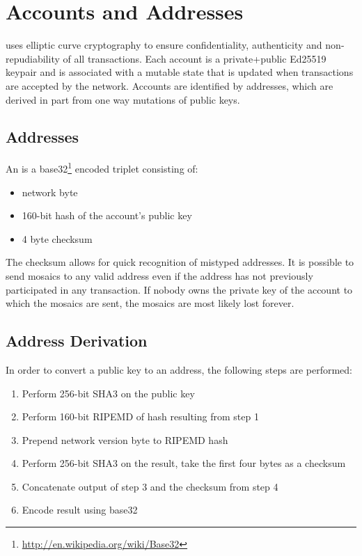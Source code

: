 \section{Accounts and Addresses}
\label{sec:accounts}


\codenamechapterfirstword uses elliptic curve cryptography to ensure confidentiality, authenticity and non-repudiability of all transactions.
Each account is a private+public Ed25519 keypair  and is associated with a mutable state that is updated when transactions are accepted by the network.
Accounts are identified by addresses, which are derived in part from one way mutations of public keys.

\subsection{Addresses}

An  is a base32\footnote{ \url{http://en.wikipedia.org/wiki/Base32} } encoded triplet consisting of:
\begin{itemize}
	\item{network byte}
	\item{160-bit hash of the account's public key}
	\item{4 byte checksum}
\end{itemize}

The checksum allows for quick recognition of mistyped addresses.
It is possible to send mosaics to any valid address even if the address has not previously participated in any transaction.
If nobody owns the private key of the account to which the mosaics are sent, the mosaics are most likely lost forever.

\subsection{Address Derivation}
In order to convert a public key to an address, the following steps are performed:
\begin{enumerate}
	\item{Perform 256-bit SHA3 on the public key}
	\item{Perform 160-bit RIPEMD of hash resulting from step 1}
	\item{Prepend network version byte to RIPEMD hash}
	\item{Perform 256-bit SHA3 on the result, take the first four bytes as a checksum}
	\item{Concatenate output of step 3 and the checksum from step 4}
	\item{Encode result using base32}
\end{enumerate}

